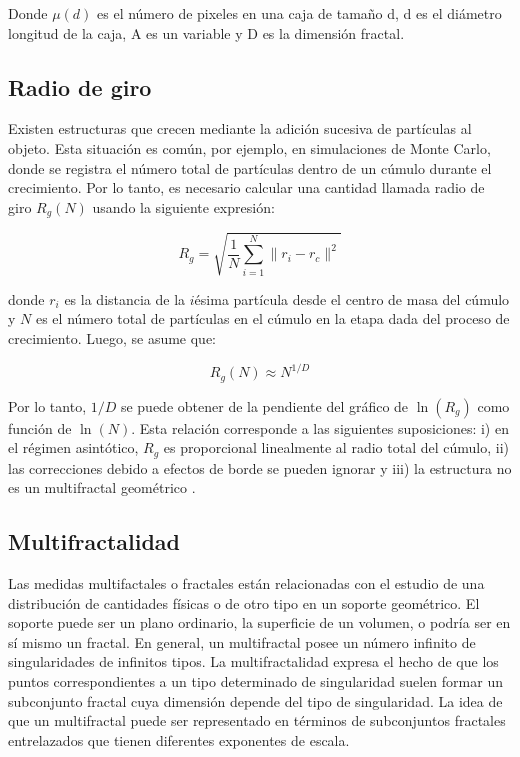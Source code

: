 \documentclass[11pt]{article}
\begin{document}
Donde $\mu(d)$ es el n\'{u}mero de pixeles en una caja de tamaño d, d es el di\'{a}metro longitud de la caja, A es un variable y D es la dimensi\'{o}n fractal\cite{Mustafa1996}. 

\subsection{Radio de giro}

Existen estructuras que crecen mediante la adici\'{o}n sucesiva de part\'{i}culas al objeto. Esta situaci\'{o}n es com\'{u}n, por ejemplo, en simulaciones de Monte Carlo, donde se registra el n\'{u}mero total de part\'{i}culas dentro de un c\'{u}mulo durante el crecimiento. Por lo tanto, es necesario calcular una cantidad llamada radio de giro  \(R_g(N)\) usando la siguiente expresi\'{o}n:

\begin{equation}
R_g = \sqrt{\frac{1}{N} \sum_{i=1}^{N} \| r_i - r_c \|^2}
\end{equation}

donde \(r_i\) es la distancia de la \(i\)\'{e}sima part\'{i}cula desde el centro de masa del c\'{u}mulo y \(N\) es el n\'{u}mero total de part\'{i}culas en el c\'{u}mulo en la etapa dada del proceso de crecimiento. Luego, se asume que:

\begin{equation}
R_g(N) \approx N^{1/D}
\end{equation}

Por lo tanto, \(1/D\) se puede obtener de la pendiente del gr\'{a}fico de \(\ln(R_g)\) como funci\'{o}n de \(\ln(N)\). Esta relaci\'{o}n corresponde a las siguientes suposiciones: i) en el r\'{e}gimen asint\'{o}tico, \(R_g\) es proporcional linealmente al radio total del c\'{u}mulo, ii) las correcciones debido a efectos de borde se pueden ignorar y iii) la estructura no es un multifractal geom\'{e}trico \cite{Mroczka2012, Vicsek1992}.

\subsection{Multifractalidad}

Las medidas multifactales o fractales est\'{a}n relacionadas con el estudio de una distribuci\'{o}n de cantidades f\'{i}sicas o de otro tipo en un soporte geom\'{e}trico. El soporte puede ser un plano ordinario, la superficie de un volumen, o podr\'{i}a ser en s\'{i} mismo un fractal. En general, un multifractal posee un n\'{u}mero infinito de singularidades de infinitos tipos. La multifractalidad expresa el hecho de que los puntos correspondientes a un tipo determinado de singularidad suelen formar un subconjunto fractal cuya dimensi\'{o}n depende del tipo de singularidad. La idea de que un multifractal puede ser representado en t\'{e}rminos de subconjuntos fractales entrelazados que tienen diferentes exponentes de escala.
\end{document}
